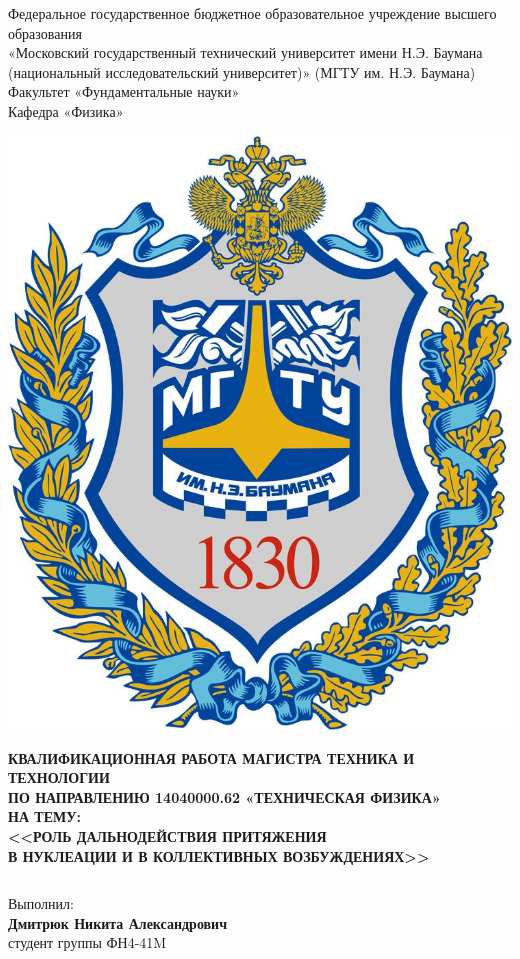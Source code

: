 \documentclass{beamer}
\begin{document}
\begin{frame}
	\begin{center}\tiny
		Федеральное государственное бюджетное образовательное учреждение высшего образования \\ «Московский государственный технический университет имени Н.Э. Баумана (национальный исследовательский университет)» (МГТУ им. Н.Э. Баумана)\\
		Факультет «Фундаментальные науки»\\
		Кафедра «Физика»\\
    \end{center}

	\begin{center}
		\includegraphics[width=0.15\linewidth]{emb}
	\end{center}

	\begin{center}
\tiny \textbf{КВАЛИФИКАЦИОННАЯ РАБОТА МАГИСТРА ТЕХНИКА И ТЕХНОЛОГИИ \\ ПО НАПРАВЛЕНИЮ 14040000.62 «ТЕХНИЧЕСКАЯ ФИЗИКА»}\\
\vspace{0.2cm}
\tiny \textbf{НА ТЕМУ:}\\
\vspace{0.1cm}
\tiny \textbf{<<РОЛЬ ДАЛЬНОДЕЙСТВИЯ ПРИТЯЖЕНИЯ \\ В НУКЛЕАЦИИ И В КОЛЛЕКТИВНЫХ ВОЗБУЖДЕНИЯХ>>}\\
\end{center}

\vspace{0.3cm}

\begin{columns}
\begin{column}{0.50\textwidth}
\begin{center}
\tiny Выполнил: \\
\vspace{0.1cm}
\tiny \textbf{Дмитрюк Никита Александрович}\\
\tiny студент группы ФН4-41M \\
\vspace{0.2cm}
\end{center}
\end{column}



\end{columns}
\end{frame}
\end{document}
